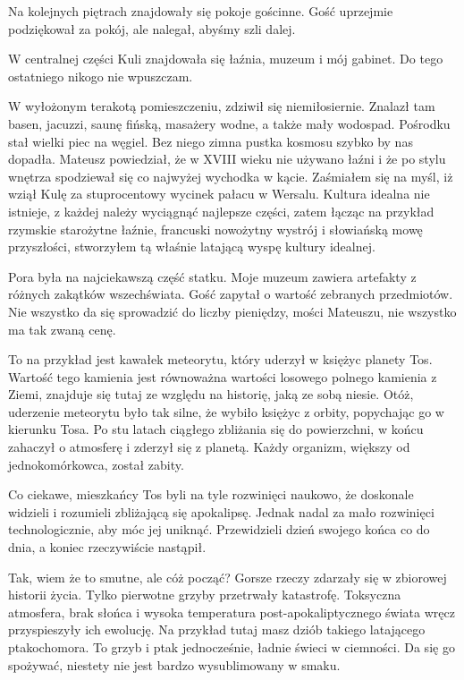 Na kolejnych piętrach znajdowały się pokoje gościnne. Gość uprzejmie podziękował za pokój, ale nalegał, abyśmy szli dalej.

W centralnej części Kuli znajdowała się łaźnia, muzeum i mój gabinet. Do tego ostatniego nikogo nie wpuszczam.

W wyłożonym terakotą pomieszczeniu, zdziwił się niemiłosiernie. Znalazł tam basen, jacuzzi, saunę fińską, masażery wodne, a także mały wodospad.
Pośrodku stał wielki piec na węgiel. Bez niego zimna pustka kosmosu szybko by nas dopadła.
Mateusz powiedział, że w XVIII wieku nie używano łaźni i że po stylu wnętrza spodziewał się co najwyżej wychodka w kącie. 
Zaśmiałem się na myśl, iż wziął Kulę za stuprocentowy wycinek pałacu w Wersalu.
Kultura idealna nie istnieje, z każdej należy wyciągnąć najlepsze części, zatem łącząc na przykład rzymskie starożytne łaźnie, francuski nowożytny wystrój i słowiańską mowę przyszłości, 
stworzyłem tą właśnie latającą wyspę kultury idealnej.

Pora była na najciekawszą część statku.
Moje muzeum zawiera artefakty z różnych zakątków wszechświata. Gość zapytał o wartość zebranych przedmiotów.
Nie wszystko da się sprowadzić do liczby pieniędzy, mości Mateuszu, nie wszystko ma tak zwaną cenę. 

To na przykład jest kawałek meteorytu, który uderzył w księżyc planety Tos. Wartość tego kamienia jest równoważna wartości losowego polnego kamienia z Ziemi, 
znajduje się tutaj ze względu na historię, jaką ze sobą niesie.
Otóż, uderzenie meteorytu było tak silne, że wybiło księżyc z orbity, popychając go w kierunku Tosa.
Po stu latach ciągłego zbliżania się do powierzchni, w końcu zahaczył o atmosferę i zderzył się z planetą.
Każdy organizm, większy od jednokomórkowca, został zabity.

Co ciekawe, mieszkańcy Tos byli na tyle rozwinięci naukowo, że doskonale widzieli i rozumieli zbliżającą się apokalipsę.
Jednak nadal za mało rozwinięci technologicznie, aby móc jej uniknąć.
Przewidzieli dzień swojego końca co do dnia, a koniec rzeczywiście nastąpił.

Tak, wiem że to smutne, ale cóż począć? Gorsze rzeczy zdarzały się w zbiorowej historii życia. 
Tylko pierwotne grzyby przetrwały katastrofę.
Toksyczna atmosfera, brak słońca i wysoka temperatura post-apokaliptycznego świata wręcz przyspieszyły ich ewolucję.
Na przykład tutaj masz dziób takiego latającego ptakochomora. To grzyb i ptak jednocześnie, ładnie świeci w ciemności.
Da się go spożywać, niestety nie jest bardzo wysublimowany w smaku.

